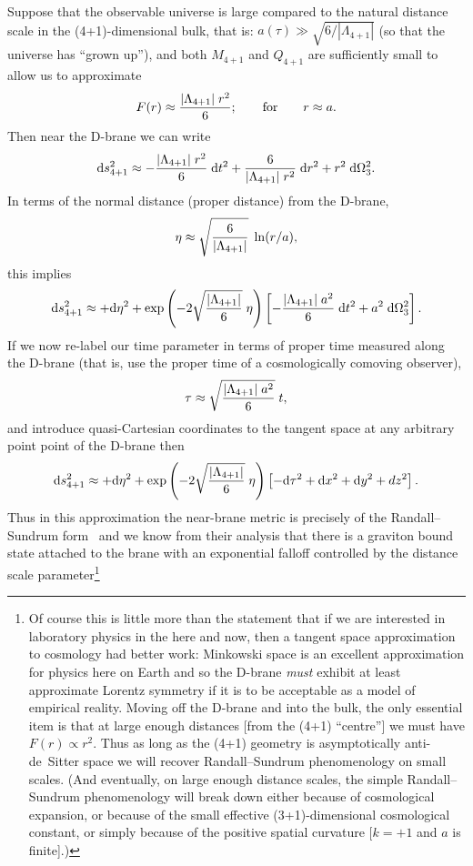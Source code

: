 \documentclass[a4paper,12pt]{article}
\begin{document}
Suppose that the observable universe is large compared to the natural
distance scale in the (4+1)-dimensional bulk, that is: $a(\tau)
\gg\sqrt{6/|\Lambda_{4+1}|}$ (so that the universe has ``grown up''),
and both $M_{4+1}$ and $Q_{4+1}$ are sufficiently small to allow us to
approximate
%
\begin{equation}
F(r) \approx { |\Lambda_{4+1}| \; r^2 \over 6}; 
\qquad \hbox{for} \qquad 
r \approx a.
\end{equation}
%
Then near the D-brane we can write
%
\begin{equation}
{\mathrm d} s^2_{4+1} \approx - { |\Lambda_{4+1}| \; r^2 \over 6} \; {\mathrm d} t^2 
+{6\over |\Lambda_{4+1}| \; r^2} \; {\mathrm d} r^2 + r^2 \; {\mathrm d}\Omega_3^2.
\end{equation}
%
In terms of the normal distance (proper distance) from the D-brane,
%
\begin{equation}
\eta \approx \sqrt{6\over |\Lambda_{4+1}|} \; \ln(r/a),
\end{equation}
%
this implies
%
\begin{equation}
{\mathrm d} s^2_{4+1} \approx 
+{\mathrm d}\eta^2 
+ \exp\left(-2\sqrt{|\Lambda_{4+1}|\over6}\; \eta\right)
\left[ - { |\Lambda_{4+1}| \; a^2\over 6} \; {\mathrm d} t^2  + a^2 \; {\mathrm d}\Omega_3^2 \right].
\end{equation}
%
If we now re-label our time parameter in terms of proper time measured
along the D-brane (that is, use the proper time of a cosmologically
comoving observer),
%
\begin{equation}
\tau \approx \sqrt{|\Lambda_{4+1}| \; a^2 \over6} \; t,
\end{equation}
%
and introduce quasi-Cartesian coordinates to the tangent space at any
arbitrary point point of the D-brane then
%
\begin{equation}
{\mathrm d} s^2_{4+1} \approx 
+{\mathrm d}\eta^2 
+ \exp\left(-2\sqrt{|\Lambda_{4+1}|\over6}\; \eta\right)
\left[ - {\mathrm d}\tau^2  + {\mathrm d} x^2 + {\mathrm d} y^2 + dz^2 \right].
\end{equation}
%
Thus in this approximation the near-brane metric is precisely of the
Randall--Sundrum form~\cite{RS1,RS2} and we know from their analysis
that there is a graviton bound state attached to the brane with an
exponential falloff controlled by the distance scale
parameter\footnote{
Of course this is little more than the statement that if we are
interested in laboratory physics in the here and now, then a tangent
space approximation to cosmology had better work: Minkowski space is
an excellent approximation for physics here on Earth and so the
D-brane {\em must\/} exhibit at least approximate Lorentz symmetry if
it is to be acceptable as a model of empirical reality. Moving off the
D-brane and into the bulk, the only essential item is that at large
enough distances [from the (4+1) ``centre''] we must have $F(r)\propto
r^2$. Thus as long as the (4+1) geometry is asymptotically
anti-de~Sitter space we will recover Randall--Sundrum phenomenology on
small scales. (And eventually, on large enough distance scales, the
simple Randall--Sundrum phenomenology will break down either because of
cosmological expansion, or because of the small effective
(3+1)-dimensional cosmological constant, or simply because of the
positive spatial curvature [$k=+1$ and $a$ is finite].)  }
\end{document}
